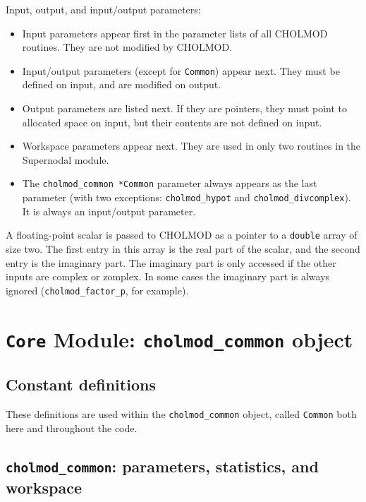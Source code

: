 \documentclass[11pt]{article}
\begin{document}
\noindent
Input, output, and input/output parameters:
\begin{itemize}
\item Input parameters appear first in the parameter lists of all CHOLMOD routines.
They are not modified by CHOLMOD.
\item Input/output parameters (except for {\tt Common}) appear next.
They must be defined on input, and are modified on output.
\item Output parameters are listed next.  If they are pointers, they must
point to allocated space on input, but their contents are not defined on input.
\item Workspace parameters appear next.  They are used in only two routines in the Supernodal module.
\item The {\tt cholmod\_common *Common} parameter always appears as the last parameter
(with two exceptions: {\tt cholmod\_hypot} and {\tt cholmod\_divcomplex}).
It is always an input/output parameter.
\end{itemize}

A floating-point scalar is passed to CHOLMOD as a pointer to a {\tt double}
array of size two.  The first entry in this array is the real part of the
scalar, and the second entry is the imaginary part.  The imaginary part is
only accessed if the other inputs are complex or zomplex.  In some cases
the imaginary part is always ignored ({\tt cholmod\_factor\_p}, for example).

\newpage \section{{\tt Core} Module: {\tt cholmod\_common} object}
\label{cholmod_common}

\subsection{Constant definitions}


These definitions are used within the {\tt cholmod\_common} object,
called {\tt Common} both here and throughout the code.

\newpage \subsection{{\tt cholmod\_common}: parameters, statistics, and workspace}
\end{document}
